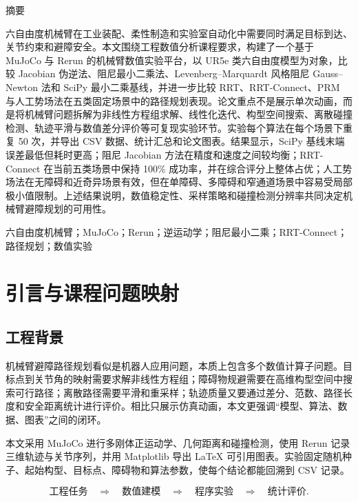 \documentclass[UTF8,zihao=-4]{ctexart}
\begin{document}
\begin{center}
  {\heiti 摘\quad 要\par}
\end{center}
\vspace{1em}
六自由度机械臂在工业装配、柔性制造和实验室自动化中需要同时满足目标到达、关节约束和避障安全。本文围绕工程数值分析课程要求，构建了一个基于 MuJoCo 与 Rerun 的机械臂数值实验平台，以 UR5e 类六自由度模型为对象，比较 Jacobian 伪逆法、阻尼最小二乘法、Levenberg--Marquardt 风格阻尼 Gauss--Newton 法和 SciPy 最小二乘基线，并进一步比较 RRT、RRT-Connect、PRM 与人工势场法在五类固定场景中的路径规划表现。论文重点不是展示单次动画，而是将机械臂问题拆解为非线性方程组求解、线性化迭代、构型空间搜索、离散碰撞检测、轨迹平滑与数值差分评价等可复现实验环节。实验每个算法在每个场景下重复 50 次，并导出 CSV 数据、统计汇总和论文图表。结果显示，SciPy 基线末端误差最低但耗时更高；阻尼 Jacobian 方法在精度和速度之间较均衡；RRT-Connect 在当前五类场景中保持 100\% 成功率，并在综合评分上整体占优；人工势场法在无障碍和近奇异场景有效，但在单障碍、多障碍和窄通道场景中容易受局部极小值限制。上述结果说明，数值稳定性、采样策略和碰撞检测分辨率共同决定机械臂避障规划的可用性\cite{siciliano2009robotics,lavalle2006planning}。

六自由度机械臂；MuJoCo；Rerun；逆运动学；阻尼最小二乘；RRT-Connect；路径规划；数值实验
\newpage

\section{引言与课程问题映射}

\subsection{工程背景}
机械臂避障路径规划看似是机器人应用问题，本质上包含多个数值计算子问题。目标点到关节角的映射需要求解非线性方程组；障碍物规避需要在高维构型空间中搜索可行路径；离散路径需要平滑和重采样；轨迹质量又要通过差分、范数、路径长度和安全距离统计进行评价。相比只展示仿真动画，本文更强调“模型、算法、数据、图表”之间的闭环。

本文采用 MuJoCo 进行多刚体正运动学、几何距离和碰撞检测\cite{todorov2012mujoco}，使用 Rerun 记录三维轨迹与关节序列\cite{rerunDocs2024}，并用 Matplotlib 导出 LaTeX 可引用图表。实验固定随机种子、起始构型、目标点、障碍物和算法参数，使每个结论都能回溯到 CSV 记录。

\begin{equation}
  \text{工程任务}
  \quad\Longrightarrow\quad
  \text{数值建模}
  \quad\Longrightarrow\quad
  \text{程序实验}
  \quad\Longrightarrow\quad
  \text{统计评价}.
  \label{eq:workflow}
\end{equation}
\end{document}
